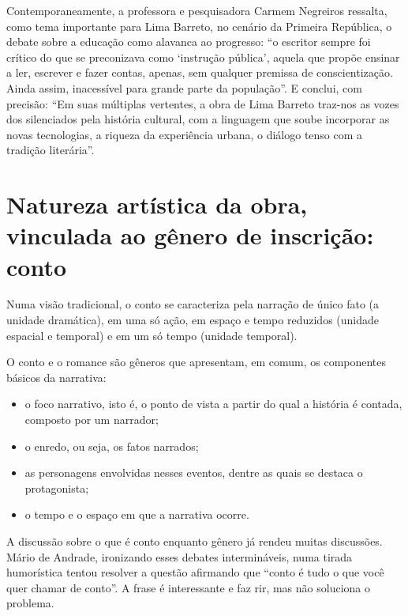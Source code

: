 Contemporaneamente, a professora e pesquisadora Carmem Negreiros
ressalta, como tema importante para Lima Barreto, no cenário da Primeira
República, o debate sobre a educação como alavanca ao progresso: ``o
escritor sempre foi crítico do que se preconizava como `instrução
pública', aquela que propõe ensinar a ler, escrever e fazer contas,
apenas, sem qualquer premissa de conscientização. Ainda assim,
inacessível para grande parte da população''. E conclui, com precisão:
``Em suas múltiplas vertentes, a obra de Lima Barreto traz-nos as vozes
dos silenciados pela história cultural, com a linguagem que soube
incorporar as novas tecnologias, a riqueza da experiência urbana, o
diálogo tenso com a tradição literária''.

\chapter{Natureza artística da obra, vinculada ao gênero de inscrição: conto}

Numa visão tradicional, o conto se caracteriza pela narração de único fato (a unidade dramática), em uma só ação, em espaço e tempo reduzidos (unidade espacial e temporal) e em um só tempo (unidade temporal). 

O conto e o romance são gêneros que apresentam, em comum, os componentes básicos da narrativa: 

\begin{itemize}
\item o foco narrativo, isto é, o ponto de vista a partir do qual a história é contada, composto por um narrador;  

\item o enredo, ou seja, os fatos narrados; 

\item as personagens envolvidas nesses eventos, dentre as quais se destaca o protagonista; 

\item o tempo e o espaço em que a narrativa ocorre.
\end{itemize}

A discussão sobre o que é conto enquanto gênero já rendeu muitas discussões. Mário de Andrade, ironizando esses debates intermináveis, numa tirada humorística tentou resolver a questão afirmando que “conto é tudo o que você quer chamar de conto”. A frase é interessante e faz rir, mas não soluciona o problema.

